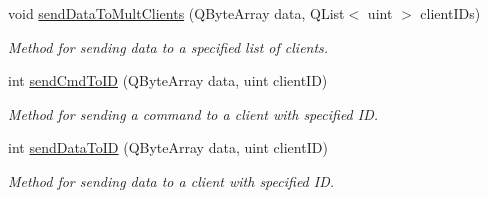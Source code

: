 \begin{DoxyCompactItemize}
void \hyperlink{class_network_1_1_server_socket_a2f9151ad52bbcb6788dfcf8e0252d19f}{send\+Data\+To\+Mult\+Clients} (Q\+Byte\+Array data, Q\+List$<$ uint $>$ client\+I\+Ds)
\begin{DoxyCompactList}\small\item\em Method for sending data to a specified list of clients. \end{DoxyCompactList}\item 
int \hyperlink{class_network_1_1_server_socket_ac222f49a8b6ed8b55e1592d954bfb7d9}{send\+Cmd\+To\+I\+D} (Q\+Byte\+Array data, uint client\+I\+D)
\begin{DoxyCompactList}\small\item\em Method for sending a command to a client with specified I\+D. \end{DoxyCompactList}\item 
int \hyperlink{class_network_1_1_server_socket_a2493f626edede9a2dda80888d01e04dc}{send\+Data\+To\+I\+D} (Q\+Byte\+Array data, uint client\+I\+D)
\begin{DoxyCompactList}\small\item\em Method for sending data to a client with specified I\+D. \end{DoxyCompactList}\end{DoxyCompactItemize}
